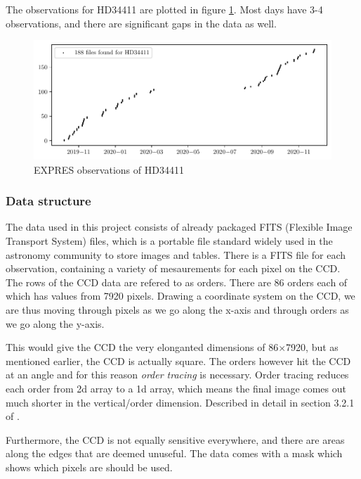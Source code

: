 The observations for HD34411 are plotted in figure \ref{fig:dates_HD34411}. Most days have 3-4 observations, and there are significant gaps in the data as well.

\begin{figure}[ht]
    \centering
    \includegraphics[scale=0.80]{figures/dates_HD34411.pdf}
    \caption{EXPRES observations of HD34411}
    \label{fig:dates_HD34411}
\end{figure}


\subsubsection{Data structure}
The data used in this project consists of already packaged FITS (Flexible Image Transport System) files, which is a portable file standard widely used in the astronomy community to store images and tables. There is a FITS file for each observation, containing a variety of mesaurements for each pixel on the CCD. 
The rows of the CCD data are refered to as orders. There are 86 orders each of which has values from 7920 pixels. Drawing a coordinate system on the CCD, we are thus moving through pixels as we go along the x-axis and through orders as we go along the y-axis.

This would give the CCD the very elonganted dimensions of 86$\times$7920, but as mentioned earlier, the CCD is actually square. The orders however hit the CCD at an angle and for this reason \emph{order tracing} is necessary. Order tracing reduces each order from 2d array to a 1d array, which means the final image comes out much shorter in the vertical/order dimension. Described in detail in section 3.2.1 of \cite{first_RV_from_EXPRES}.

Furthermore, the CCD is not equally sensitive everywhere, and there are areas along the edges that are deemed unuseful. The data comes with a mask which shows which pixels are should be used. 

